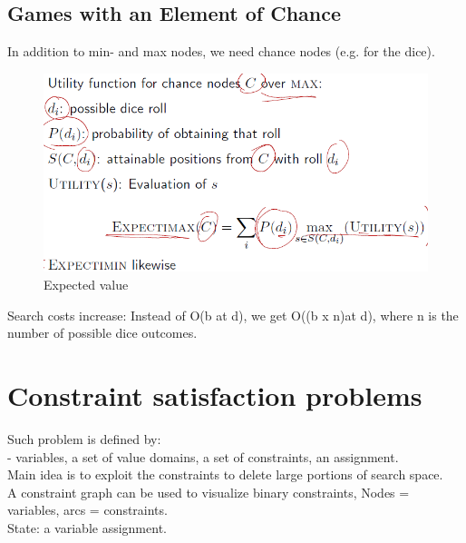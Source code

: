 \documentclass{article}
\begin{document}
\subsection{Games with an Element of Chance}
In addition to min- and max nodes, we need chance nodes (e.g. for the dice).\\
\begin{figure}
	\includegraphics[scale=0.6]{23.png}
	\caption{Expected value}
\end{figure}
Search costs increase: Instead of O(b at d), we get O((b x n)at d), where n is
the number of possible dice outcomes.\\

\section{Constraint satisfaction problems}
Such problem is defined by:\\
- variables, a set of value domains, a set of constraints, an assignment.\\
Main idea is to exploit the constraints to delete large portions of search space.\\
A constraint graph can be used to visualize binary constraints, Nodes = variables, arcs = constraints.\\
State: a variable assignment.
\end{document}
